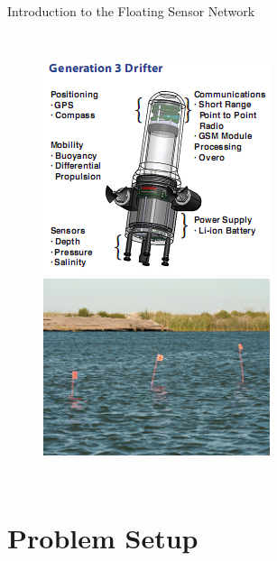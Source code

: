 \documentclass[xcolor=pdflatex,dvipsnames,table]{beamer}
\begin{document}
\begin{frame}{Introduction to the Floating Sensor Network}
\begin{columns}
\begin{figure}
\includegraphics[height=0.5\textheight]{figures/drifter.png}\\
\includegraphics[width=1\textwidth,height=0.3\textheight,clip,trim=0 20 0 20,keepaspectratio=true]{figures/drifter_in_water.png}
\end{figure}
\end{columns}
\end{frame}


\AtBeginSection[]
{
   \begin{frame}
       \tableofcontents[currentsection]
   \end{frame}
}

\section{Problem Setup}
\end{document}
